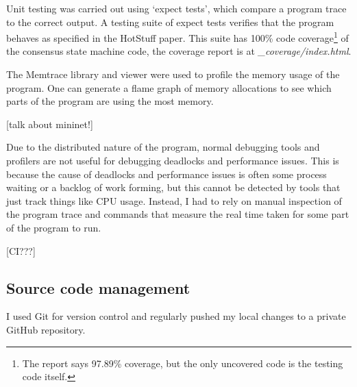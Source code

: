 Unit testing was carried out using `expect tests', which compare a program trace to the correct output. A testing suite of expect tests verifies that the program behaves as specified in the HotStuff paper. This suite has 100\% code coverage\footnote{The report says 97.89\% coverage, but the only uncovered code is the testing code itself.} of the consensus state machine code, the coverage report is at \textit{\_coverage/index.html}.

The Memtrace library \cite{noauthor_memtrace_nodate} and viewer were used to profile the memory usage of the program. One can generate a flame graph of memory allocations to see which parts of the program are using the most memory.

[talk about mininet!] \cite{noauthor_mininet_nodate}

Due to the distributed nature of the program, normal debugging tools and profilers are not useful for debugging deadlocks and performance issues. This is because the cause of deadlocks and performance issues is often some process waiting or a backlog of work forming, but this cannot be detected by tools that just track things like CPU usage. Instead, I had to rely on manual inspection of the program trace and commands that measure the real time taken for some part of the program to run.

[CI???]

\subsection{Source code management}

I used Git for version control and regularly pushed my local changes to a private GitHub repository.